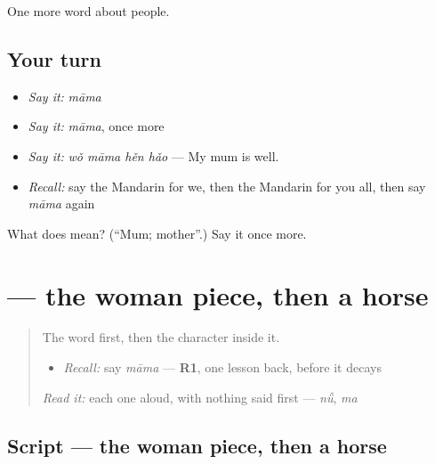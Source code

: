 \begin{grammarlens}[title={What you've built}]
One more word about people.
\end{grammarlens}

\subsection*{Your turn}
\begin{itemize}
\raggedright
  \item \emph{Say it:} \emph{māma}
  \item \emph{Say it:} \emph{māma}, once more
  \item \emph{Say it:} \emph{wǒ māma hěn hǎo} — My mum is well.
  \item \emph{Recall:} say the Mandarin for we, then the Mandarin for you all, then say \emph{māma} again
\end{itemize}

\begin{tcolorbox}[breakable,colback=teal!4,colframe=teal!35!black,title={Before you move on}]
What does  mean? (\textquotedblleft{}Mum; mother\textquotedblright{}.) Say it once more.
\end{tcolorbox}
\section[\texorpdfstring{\zh{妈} (mā)}{妈 (mā)}]{ — the woman piece, then a horse}

\label{lesson:ZH-W32-ma-mum}



\begin{quote}
The word first, then the character inside it.

\begin{itemize}
\raggedright
  \item \emph{Recall:} say \emph{māma} — \textbf{R1}, one lesson back, before it decays
\end{itemize}

\begin{quote}
 
\end{quote}

\emph{Read it:} each one aloud, with nothing said first — \emph{nǚ}, \emph{ma}
\end{quote}

\subsection*{Script — the woman piece, then a horse}

